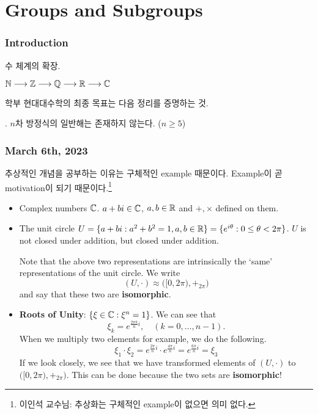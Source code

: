 \part{Groups and Subgroups}

\section*{Introduction}



수 체계의 확장.
\begin{center}
    \(\mathbb{N} \longrightarrow \mathbb{Z} \longrightarrow \mathbb{Q} \longrightarrow \mathbb{R} \longrightarrow \mathbb{C}\)
\end{center}

학부 현대대수학의 최종 목표는 다음 정리를 증명하는 것.

\thm. \(n\)차 방정식의 일반해는 존재하지 않는다. (\(n \geq 5\))

\section*{March 6th, 2023}

추상적인 개념을 공부하는 이유는 구체적인 example 때문이다. Example이 곧 motivation이 되기 때문이다.\footnote{이인석 교수님: 추상화는 구체적인 example이 없으면 의미 없다.}

\begin{itemize}
    \item Complex numbers \(\mathbb{C}\). \(a + bi \in \mathbb{C}\), \(a, b \in \mathbb{R}\) and \(+, \times\) defined on them.
    \item The unit circle \(U = \{a + bi : a^2 + b^2 = 1, a, b \in \mathbb{R}\} = \{e^{i\theta} : 0 \leq \theta < 2\pi\}\). \(U\) is not closed under addition, but closed under addition.

          Note that the above two representations are intrinsically the `same' representations of the unit circle. We write
          \[
              (U, \cdot) \approx \bigl([0, 2\pi), +_{2\pi}\bigr)
          \]
          and say that these two are \textbf{isomorphic}.
    \item \textbf{Roots of Unity}: \(\{\xi \in \mathbb{C} : \xi^n = 1\}\). We can see that
          \[
              \xi_k = e^{\frac{2\pi k}{n}i}, \quad (k = 0, \dots, n - 1).
          \]
          When we multiply two elements for example, we do the following.
          \[
              \xi_1 \cdot \xi_2 = e^{\frac{2\pi}{n}i} \cdot e^{\frac{4\pi}{n}i} = e^{\frac{6\pi}{n}i} = \xi_3
          \]
          If we look closely, we see that we have transformed elements of \((U, \cdot)\) to \(\bigl([0, 2\pi), +_{2\pi}\bigr)\). This can be done because the two sets are \textbf{isomorphic}!
\end{itemize}

\pagebreak
